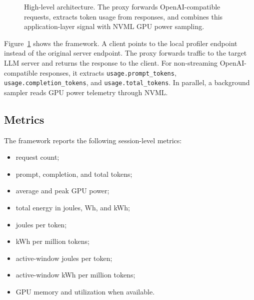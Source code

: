 \documentclass[conference]{IEEEtran}
\begin{document}
\begin{figure}[t]
\centering
{}
\caption{High-level architecture. The proxy forwards OpenAI-compatible requests, extracts token usage from responses, and combines this application-layer signal with NVML GPU power sampling.}
\label{fig:architecture}
\end{figure}

Figure~\ref{fig:architecture} shows the framework. A client points to the local profiler endpoint instead of the original server endpoint. The proxy forwards traffic to the target LLM server and returns the response to the client. For non-streaming OpenAI-compatible responses, it extracts \texttt{usage.prompt\_tokens}, \texttt{usage.completion\_tokens}, and \texttt{usage.total\_tokens}. In parallel, a background sampler reads GPU power telemetry through NVML.

\subsection{Metrics}

The framework reports the following session-level metrics:

\begin{itemize}
    \item request count;
    \item prompt, completion, and total tokens;
    \item average and peak GPU power;
    \item total energy in joules, Wh, and kWh;
    \item joules per token;
    \item kWh per million tokens;
    \item active-window joules per token;
    \item active-window kWh per million tokens;
    \item GPU memory and utilization when available.
\end{itemize}
\end{document}
